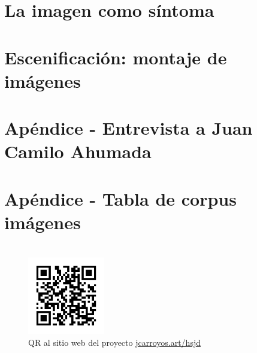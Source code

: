 \documentclass[12pt,oneside,openany]{report}
\begin{document}
\chapter{La imagen como síntoma}


\chapter{Escenificación: montaje de imágenes}



\clearpage
\listoffigures
\listoftables   

\printbibliography[title={Bibliografía}, nottype=online]

\printbibliography[title={Videografía}, type=online]


\footnotesize
\appendix
\chapter{Apéndice - Entrevista a Juan Camilo Ahumada}
\label{apendiceA}


\chapter{Apéndice - Tabla de corpus imágenes}
\label{apendiceB}

\normalsize

\chapter*{}

\begin{figure}[h!]
    \thispagestyle{empty}
    \captionsetup{labelformat=empty}
    \centering
    \includegraphics[width=0.3\textwidth]{qr_jcarroyos_research.png}
    \caption{QR al sitio web del proyecto \href{https://jcarroyos.art/docs/research/hsjd}{jcarroyos.art/hsjd}}
\end{figure}
\end{document}
